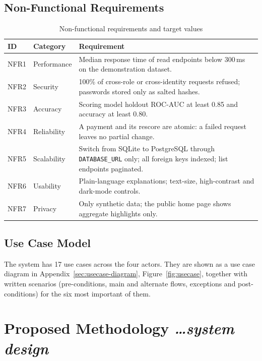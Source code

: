 \documentclass[11pt,a4paper]{article}
\newcommand{\BvrHint}[1]{%
  {\normalfont\normalsize\itshape\hfill #1}}
\newcommand{\code}[1]{\texttt{\small #1}}
\begin{document}
\subsection{Non-Functional Requirements}
\begin{table}[H]
\centering
\caption{Non-functional requirements and target values}
\label{tab:nfr}
\small
\begin{tabular}{@{}lL{3cm}L{10.2cm}@{}}
\toprule
\textbf{ID} & \textbf{Category} & \textbf{Requirement}\\
\midrule
NFR1 & Performance & Median response time of read endpoints below 300\,ms on the demonstration dataset.\\
NFR2 & Security & 100\% of cross-role or cross-identity requests refused; passwords stored only as salted hashes.\\
NFR3 & Accuracy & Scoring model holdout ROC-AUC at least 0.85 and accuracy at least 0.80.\\
NFR4 & Reliability & A payment and its rescore are atomic: a failed request leaves no partial change.\\
NFR5 & Scalability & Switch from SQLite to PostgreSQL through \code{DATABASE\_URL} only; all foreign keys indexed; list endpoints paginated.\\
NFR6 & Usability & Plain-language explanations; text-size, high-contrast and dark-mode controls.\\
NFR7 & Privacy & Only synthetic data; the public home page shows aggregate highlights only.\\
\bottomrule
\end{tabular}
\end{table}

\subsection{Use Case Model}
The system has 17 use cases across the four actors. They are shown as a use
case diagram in Appendix~\ref{sec:usecase-diagram},
Figure~\ref{fig:usecase}, together with written scenarios (pre-conditions,
main and alternate flows, exceptions and post-conditions) for the six most
important of them.

\section{Proposed Methodology%
\BvrHint{\ldots system design}}
\label{sec:method}
\end{document}
